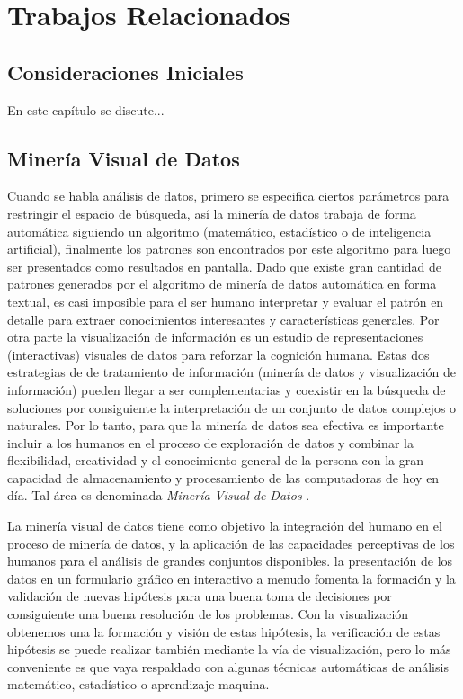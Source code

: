 \chapter{Trabajos Relacionados}
\section{Consideraciones Iniciales}
En este capítulo se discute... 
\section{Minería Visual de Datos}

Cuando se habla análisis de datos, primero se especifica ciertos parámetros para restringir el espacio de búsqueda, así la minería de datos trabaja de forma automática siguiendo un algoritmo (matemático, estadístico o de inteligencia artificial), finalmente los patrones son encontrados por este algoritmo para luego ser presentados como resultados en pantalla. Dado que existe gran cantidad de patrones generados por el algoritmo de minería de datos automática en forma textual, es casi imposible para el ser humano interpretar y evaluar el patrón en detalle para extraer conocimientos interesantes y características generales. Por otra parte la visualización de información es un estudio de representaciones (interactivas) visuales de datos para reforzar la cognición humana. Estas dos estrategias de de tratamiento de información (minería de datos y visualización de información) pueden llegar a ser complementarias y coexistir en la búsqueda de soluciones por consiguiente la interpretación de un conjunto de datos complejos o naturales. Por lo tanto, para que la minería de datos sea efectiva es importante incluir a los humanos en el proceso de exploración de datos y combinar la flexibilidad, creatividad y el conocimiento general de la persona con la gran capacidad de almacenamiento y procesamiento de las computadoras de hoy en día. Tal área es denominada \textit{Minería Visual de Datos} \cite{wong1999guest}.

La minería visual de datos tiene como objetivo la integración del humano en el proceso de minería de datos, y la aplicación de las capacidades perceptivas de los humanos para el análisis de grandes conjuntos disponibles. la presentación de los datos en un formulario gráfico en interactivo a menudo fomenta la formación y la validación de nuevas hipótesis para una buena toma de decisiones por consiguiente una buena resolución de los problemas. Con la visualización obtenemos una la formación y visión de estas hipótesis, la verificación de estas hipótesis se puede realizar también mediante la vía de visualización, pero lo más conveniente es que vaya respaldado con algunas técnicas automáticas de análisis matemático, estadístico o aprendizaje maquina. 

